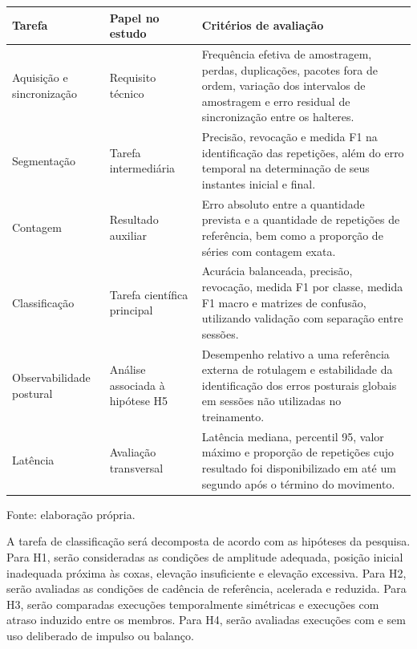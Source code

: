 \begin{quadro}[htb]
    \caption{Tarefas avaliadas no HalterCheck}
    \label{qua:tarefas-avaliadas}
    \centering
    \small
    \begin{tabular}{|p{}|p{}|p{}|}
        \hline
        \textbf{Tarefa} &
        \textbf{Papel no estudo} &
        \textbf{Critérios de avaliação} \\
        \hline
        Aquisição e sincronização &
        Requisito técnico &
        Frequência efetiva de amostragem, perdas, duplicações, pacotes
        fora de ordem, variação dos intervalos de amostragem e erro
        residual de sincronização entre os halteres.
        \\
        \hline
        Segmentação &
        Tarefa intermediária &
        Precisão, revocação e medida F1 na identificação das repetições,
        além do erro temporal na determinação de seus instantes inicial
        e final.
        \\
        \hline
        Contagem &
        Resultado auxiliar &
        Erro absoluto entre a quantidade prevista e a quantidade de
        repetições de referência, bem como a proporção de séries com
        contagem exata.
        \\
        \hline
        Classificação &
        Tarefa científica principal &
        Acurácia balanceada, precisão, revocação, medida F1 por classe,
        medida F1 macro e matrizes de confusão, utilizando validação com
        separação entre sessões.
        \\
        \hline
        Observabilidade postural &
        Análise associada à hipótese H5 &
        Desempenho relativo a uma referência externa de rotulagem e
        estabilidade da identificação dos erros posturais globais em
        sessões não utilizadas no treinamento.
        \\
        \hline
        Latência &
        Avaliação transversal &
        Latência mediana, percentil 95, valor máximo e proporção de
        repetições cujo resultado foi disponibilizado em até um segundo
        após o término do movimento.
        \\
        \hline
    \end{tabular}
    \begin{flushleft}
        \footnotesize Fonte: elaboração própria.
    \end{flushleft}
\end{quadro}

A tarefa de classificação será decomposta de acordo com as hipóteses da
pesquisa. Para H1, serão consideradas as condições de amplitude adequada,
posição inicial inadequada próxima às coxas, elevação insuficiente e
elevação excessiva. Para H2, serão avaliadas as condições de cadência de
referência, acelerada e reduzida. Para H3, serão comparadas execuções
temporalmente simétricas e execuções com atraso induzido entre os
membros. Para H4, serão avaliadas execuções com e sem uso deliberado de
impulso ou balanço.

